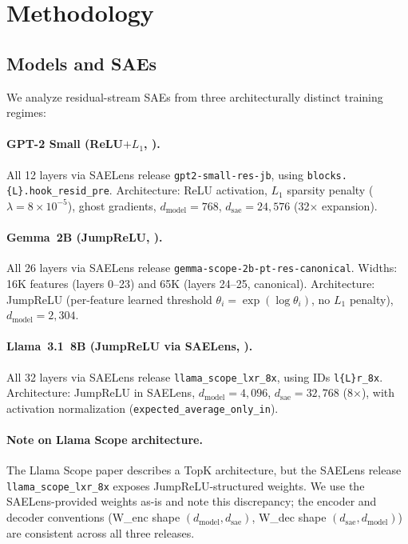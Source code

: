 \documentclass[11pt,a4paper]{article}
\begin{document}
\section{Methodology}
\label{sec:methodology}

\subsection{Models and SAEs}

We analyze residual-stream SAEs from three architecturally distinct training regimes:

\paragraph{GPT-2 Small (ReLU$+L_1$, \citealt{bloom2024}).}
All 12 layers via SAELens release \texttt{gpt2-small-res-jb}, using \texttt{blocks.\{L\}.\allowbreak hook\_resid\_pre}. Architecture: ReLU activation, $L_1$ sparsity penalty ($\lambda = 8 \times 10^{-5}$), ghost gradients, $d_\text{model}=768$, $d_\text{sae}=24{,}576$ (32$\times$ expansion).

\paragraph{Gemma~2B (JumpReLU, \citealt{lieberum2024}).}
All 26 layers via SAELens release \texttt{gemma-scope-2b-pt-res-canonical}. Widths: 16K features (layers 0--23) and 65K (layers 24--25, canonical). Architecture: JumpReLU (per-feature learned threshold $\theta_i = \exp(\log\theta_i)$, no $L_1$ penalty), $d_\text{model}=2{,}304$.

\paragraph{Llama~3.1~8B (JumpReLU via SAELens, \citealt{he2024}).}
All 32 layers via SAELens release \texttt{llama\_scope\_lxr\_8x}, using IDs \texttt{l\{L\}r\_8x}. Architecture: JumpReLU in SAELens, $d_\text{model}=4{,}096$, $d_\text{sae}=32{,}768$ (8$\times$), with activation normalization (\texttt{expected\_average\_only\_in}).

\paragraph{Note on Llama Scope architecture.} The Llama Scope paper \citep{he2024} describes a TopK architecture, but the SAELens release \texttt{llama\_scope\_lxr\_8x} exposes JumpReLU-structured weights. We use the SAELens-provided weights as-is and note this discrepancy; the encoder and decoder conventions (W\_enc shape $(d_\text{model}, d_\text{sae})$, W\_dec shape $(d_\text{sae}, d_\text{model})$) are consistent across all three releases.
\end{document}
